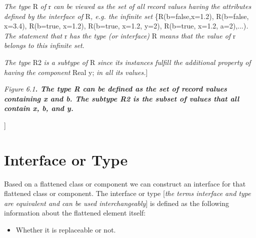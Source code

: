 \documentclass[10pt,a4paper]{report}
\def\doublelabel#1{\label{#1}\hypertarget{#1}{}}
\begin{document}
\emph{The type} R \emph{of} r \emph{can be viewed as the set of all
record values having the attributes defined by the interface of}
R\emph{, e.g. the infinite set} \{R(b=false,x=1.2), R(b=false, x=3.4),
R(b=true, x=1.2), R(b=true, x=1.2, y=2), R(b=true, x=1.2,
a=2),...)\emph{. The statement that} r \emph{has the type (or
interface)} R \emph{means that the value of} r \emph{belongs to this
infinite set}.

\emph{The type} R2 \emph{is a subtype of} R \emph{since its instances
fulfill the additional property of having the component} Real y;
\emph{in all its values.}{]}

\emph{Figure} \emph{6.1\textbf{. The type R can be defined as the set of
record values containing x and b. The subtype R2 is the subset of values
that all contain x, b, and y.}}

{]}

\section{Interface or Type}\doublelabel{interface-or-type}

Based on a flattened class or component we can construct an interface
for that flattened class or component. The interface or type
{[}\emph{the terms interface and type are equivalent and can be used
interchangeably}{]} is defined as the following information about the
flattened element itself:

\begin{itemize}
\item
  Whether it is replaceable or not.
\end{itemize}
\end{document}
